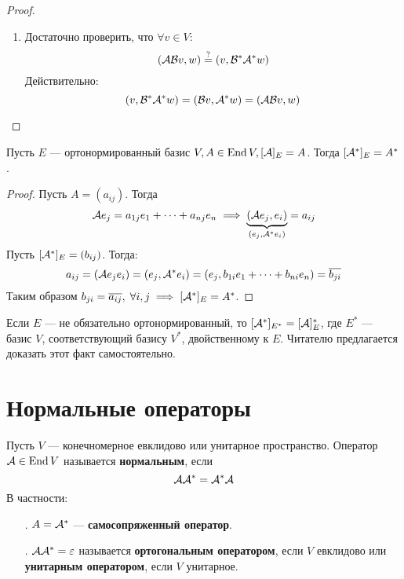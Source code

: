 \documentclass[../main.tex]{subfiles}
\begin{document}
\begin{proof}
\begin{enumerate}
    \item Достаточно проверить, что $\forall v \in V$:
    \begin{equation*}
      (\mathcal{A} \mathcal{B} v, w) \overset{?}{=} (v, \mathcal{B}^{*} \mathcal{A}^{*} w)
    \end{equation*}
    Действительно:
    \begin{equation*}
      (v, \mathcal{B}^{*} \mathcal{A}^{*} w) =
      (\mathcal{B} v, \mathcal{A}^{*} w) =
      (\mathcal{A} \mathcal{B} v, w)
    \end{equation*}
  \end{enumerate}
\end{proof}

\begin{theorem-non}
  Пусть $E$ --- ортонормированный базис $V, A \in \operatorname{End} V, [\mathcal{A}]_E = A$. Тогда $[\mathcal{A}^{*}]_E = A^{*}$.
\end{theorem-non}
\begin{proof}
  Пусть $A = (a_{ij})$. Тогда
  \begin{equation*}
    \mathcal{A} e_j = a_{1 j} e_1 + \dotsb + a_{n j} e_n \implies
    \underbrace{(\mathcal{A} e_j, e_i)}_{(e_j, \mathcal{A}^{*} e_i)} = a_{i j}
  \end{equation*}
  Пусть $[\mathcal{A}^{*}]_E = (b_{i j})$. Тогда:
  \begin{equation*}
    a_{i j} =
    (\mathcal{A} e_j e_i) =
    (e_j, \mathcal{A}^{*} e_i) =
    (e_j, b_{1 i} e_1 + \dotsb + b_{n i} e_n) =
    \overline{b_{j i}}
  \end{equation*}
  Таким образом $b_{j i} = \overline{a_{i j}},\; \forall i, j \implies [\mathcal{A}^{*}]_E = A^{*}$.
\end{proof}

\begin{remark}
  Если $E$ --- не обязательно ортонормированный, то $[\mathcal{A}^{*}]_{E^{*}} = [\mathcal{A}]_E^{*}$, где $E^{*}$ --- базис $V$, соответствующий базису $V^{*}$, двойственному к $E$. Читателю предлагается доказать этот факт самостоятельно.
\end{remark}

\section{Нормальные операторы}
\begin{definition}
  Пусть $V$ --- конечномерное евклидово или унитарное пространство. Оператор $\mathcal{A} \in \operatorname{End} V$ называется \textbf{нормальным}, если
  \begin{equation*}
    \mathcal{A} \mathcal{A}^{*} = \mathcal{A}^{*} \mathcal{A}
  \end{equation*}
  В частности:
  \begin{enumerate}
    \item[\rom{1}.] $A = \mathcal{A}^{*}$ --- \textbf{самосопряженный оператор}.
    \item[\rom{2}.] $\mathcal{A} \mathcal{A}^{*} = \varepsilon$ называется \textbf{ортогональным оператором}, если $V$ евклидово или \textbf{унитарным оператором}, если $V$ унитарное.
  \end{enumerate}
\end{definition}
\end{document}
